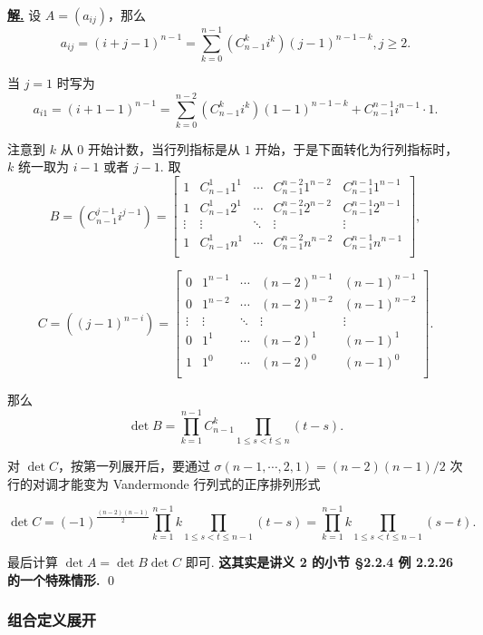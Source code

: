 \documentclass[10pt,openany]{article}
\theoremstyle{thmstyle} %
\theoremstyle{defstyle} %
\theoremstyle{prostyle} %
\theoremstyle{exastyle}
\theoremstyle{remstyle}
\newenvironment{solution}{\par\underline{\textbf{解.}} \;\fangsong}{\qed\par}
\begin{document}
\begin{solution}
	设 \( A=(a_{ij}) \)，那么
	\[ a_{ij}=(i+j-1)^{n-1}= \sum_{k=0}^{n-1} (C_{n-1}^k i^{k}) (j-1)^{n-1-k}, j \geq 2. \]
	
	当 \( j=1 \) 时写为
	\[ a_{i1}=(i+1-1)^{n-1}=\sum_{k=0}^{n-2} (C_{n-1}^k i^{k}) (1-1)^{n-1-k}+ C_{n-1}^{n-1} i^{n-1} \cdot 1. \]
	
	注意到 \( k \) 从 0 开始计数，当行列指标是从 \( 1 \) 开始，于是下面转化为行列指标时，\( k \) 统一取为 \( i-1 \) 或者 \( j-1 \). 取
	\[ B=(C_{n-1}^{j-1} i^{j-1})= \begin{bmatrix}
		1 & C_{n-1}^1 1^1 & \cdots & C_{n-1}^{n-2} 1^{n-2} & C_{n-1}^{n-1} 1^{n-1}  \\
		1 & C_{n-1}^1 2^1 & \cdots & C_{n-1}^{n-2} 2^{n-2} & C_{n-1}^{n-1} 2^{n-1}  \\
		\vdots & \vdots & \ddots & \vdots & \vdots \\
		1 & C_{n-1}^1 n^1 & \cdots & C_{n-1}^{n-2} n^{n-2} & C_{n-1}^{n-1} n^{n-1}  \\
	\end{bmatrix}, \]
	
	\[ C=((j-1)^{n-i})= \begin{bmatrix}
		0 & 1^{n-1} & \cdots & (n-2)^{n-1} & (n-1)^{n-1} \\
		0 & 1^{n-2} & \cdots & (n-2)^{n-2} & (n-1)^{n-2} \\
		\vdots & \vdots & \ddots & \vdots & \vdots \\
		0 & 1^{1} & \cdots & (n-2)^{1} & (n-1)^{1} \\
		1 & 1^{0} & \cdots & (n-2)^{0} & (n-1)^{0} \\
	\end{bmatrix}. \]
	
	那么 
	\[ \det B= \prod_{k=1}^{n-1} C_{n-1}^k \prod_{1 \leq s<t \leq n}^{} (t-s). \]
	
	对 \( \det C \)，按第一列展开后，要通过 \( \sigma(n-1,\cdots,2,1)=(n-2)(n-1)/2 \) 次行的对调才能变为 Vandermonde 行列式的正序排列形式
	
	\[ \det C= (-1)^{\frac{(n-2)(n-1)}{2}} \prod_{k=1}^{n-1} k \prod_{1 \leq s<t \leq n-1}^{} (t-s)= \prod_{k=1}^{n-1} k \prod_{1 \leq s<t \leq n-1}^{} (s-t). \]
	
	最后计算 \( \det A=\det B \det C \) 即可. \textbf{这其实是讲义 2 的小节 \S 2.2.4 例 2.2.26 的一个特殊情形.}
\end{solution}

\subsubsection{组合定义展开}
\end{document}

